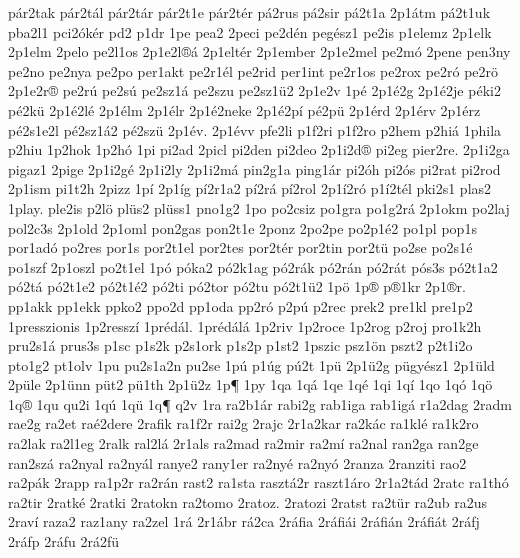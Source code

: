 {p^^e1r2tak
p^^e1r2t^^e1l
p^^e1r2t^^e1r
p^^e1r2t1e
p^^e1r2t^^e9r
p^^e12rus
p^^e12sir
p^^e12t1a
2p1^^e1tm
p^^e12t1uk
pba2l1
pci2^^f3k^^e9r
pd2
p1dr
1pe
pea2
2peci
pe2d^^e9n
peg^^e9sz1
pe2is
p1elemz
2p1elk
2p1elm
2pelo
pe2l1os
2p1e2l^^ae^^e1
2p1elt^^e9r
2p1ember
2p1e2mel
pe2m^^f3
2pene
pen3ny
pe2no
pe2nya
pe2po
per1akt
pe2r1^^e9l
pe2rid
per1int
pe2r1os
pe2rox
pe2r^^f3
pe2r^^f6
2p1e2r^^ae
pe2r^^fa
pe2s^^fa
pe2sz1^^e1
pe2szu
pe2sz1^^fc2
2p1e2v
1p^^e9
2p1^^e92g
2p1^^e92je
p^^e9ki2
p^^e92k^^fc
2p1^^e92l^^e9
2p1^^e9lm
2p1^^e9lr
2p1^^e92neke
2p1^^e92p^^ed
p^^e92p^^fc
2p1^^e9rd
2p1^^e9rv
2p1^^e9rz
p^^e92s1e2l
p^^e92sz1^^e12
p^^e92sz^^fc
2p1^^e9v.
2p1^^e9vv
pfe2li
p1f2ri
p1f2ro
p2hem
p2hi^^e1
1phila
p2hiu
1p2hok
1p2h^^f3
1pi
pi2ad
2picl
pi2den
pi2deo
2p1i2d^^ae
pi2eg
pier2re.
2p1i2ga
pigaz1
2pige
2p1i2g^^e9
2p1i2ly
2p1i2m^^e1
pin2g1a
ping1^^e1r
pi2^^f3h
pi2^^f3s
pi2rat
pi2rod
2p1ism
pi1t2h
2pizz
1p^^ed
2p1^^edg
p^^ed2r1a2
p^^ed2r^^e1
p^^ed2rol
2p1^^ed2r^^f3
p1^^ed2t^^e9l
pki2s1
plas2
1play.
ple2is
p2l^^f6
pl^^fcs2
pl^^fcss1
pno1g2
1po
po2csiz
po1gra
po1g2r^^e1
2p1okm
po2laj
pol2c3s
2p1old
2p1oml
pon2gas
pon2t1e
2ponz
2po2pe
po2p1^^e92
po1pl
pop1s
por1ad^^f3
po2res
por1s
por2t1el
por2tes
por2t^^e9r
por2tin
por2t^^fc
po2se
po2s1^^e9
po1szf
2p1oszl
po2t1el
1p^^f3
p^^f3ka2
p^^f32k1ag
p^^f32r^^e1k
p^^f32r^^e1n
p^^f32r^^e1t
p^^f3s3s
p^^f32t1a2
p^^f32t^^e1
p^^f32t1e2
p^^f32t1^^e92
p^^f32ti
p^^f32tor
p^^f32tu
p^^f32t1^^fc2
1p^^f6
1p^^ae
p^^ae1kr
2p1^^aer.
pp1akk
pp1ekk
ppko2
ppo2d
pp1oda
pp2r^^f3
p2p^^fa
p2rec
prek2
pre1kl
pre1p2
1presszionis
1p2ressz^^ed
1pr^^e9d^^e1l.
1pr^^e9d^^e1l^^e1
1p2riv
1p2roce
1p2rog
p2roj
pro1k2h
pru2s1^^e1
prus3s
p1sc
p1s2k
p2s1ork
p1s2p
p1st2
1pszic
psz1^^f6n
pszt2
p2t1i2o
pto1g2
pt1olv
1pu
pu2s1a2n
pu2se
1p^^fa
p1^^fag
p^^fa2t
1p^^fc
2p1^^fc2g
p^^fcgy^^e9sz1
2p1^^fcld
2p^^fcle
2p1^^fcnn
p^^fct2
p^^fc1th
2p1^^fc2z
1p^^b6
1py
1qa
1q^^e1
1qe
1q^^e9
1qi
1q^^ed
1qo
1q^^f3
1q^^f6
1q^^ae
1qu
qu2i
1q^^fa
1q^^fc
1q^^b6
q2v
1ra
ra2b1^^e1r
rabi2g
rab1iga
rab1ig^^e1
r1a2dag
2radm
rae2g
ra2et
ra^^e92dere
2rafik
ra1f2r
rai2g
2rajc
2r1a2kar
ra2k^^e1c
ra1kl^^e9
ra1k2ro
ra2lak
ra2l1eg
2ralk
ral2l^^e1
2r1als
ra2mad
ra2mir
ra2m^^ed
ra2nal
ran2ga
ran2ge
ran2sz^^e1
ra2nyal
ra2ny^^e1l
ranye2
rany1er
ra2ny^^e9
ra2ny^^f3
2ranza
2ranziti
rao2
ra2p^^e1k
2rapp
ra1p2r
ra2r^^e1n
rast2
ra1sta
raszt^^e12r
raszt1^^e1ro
2r1a2t^^e1d
2ratc
ra1th^^f3
ra2tir
2ratk^^e9
2ratki
2ratokn
ra2tomo
2ratoz.
2ratozi
2ratst
ra2t^^fcr
ra2ub
ra2us
2rav^^ed
raza2
raz1any
ra2zel
1r^^e1
2r1^^e1br
r^^e12ca
2r^^e1fia
2r^^e1fi^^e1i
2r^^e1fi^^e1n
2r^^e1fi^^e1t
2r^^e1fj
2r^^e1fp
2r^^e1fu
2r^^e12f^^fc
}
